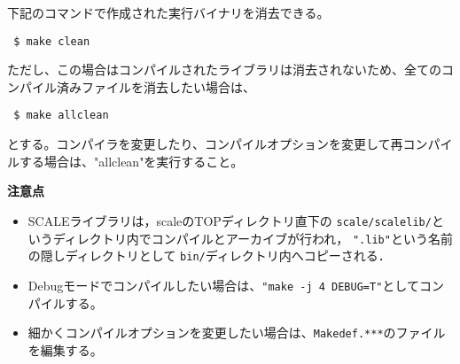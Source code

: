 下記のコマンドで作成された実行バイナリを消去できる。
\begin{verbatim}
 $ make clean
\end{verbatim}
ただし、この場合はコンパイルされたライブラリは消去されないため、全てのコンパイル済みファイルを消去したい場合は、
\begin{verbatim}
 $ make allclean
\end{verbatim}
とする。コンパイラを変更したり、コンパイルオプションを変更して再コンパイルする場合は、"allclean"を実行すること。


{\bf 注意点}
\begin{itemize}
\item SCALEライブラリは，scaleのTOPディレクトリ直下の
 \verb|scale/scalelib/|というディレクトリ内でコンパイルとアーカイブが行われ，
 \verb|".lib"|という名前の隠しディレクトリとして
 \verb|bin/|ディレクトリ内へコピーされる．
\item Debugモードでコンパイルしたい場合は、\verb|"make -j 4 DEBUG=T"|としてコンパイルする。
\item 細かくコンパイルオプションを変更したい場合は、\verb|Makedef.***|のファイルを編集する。
\end{itemize}



